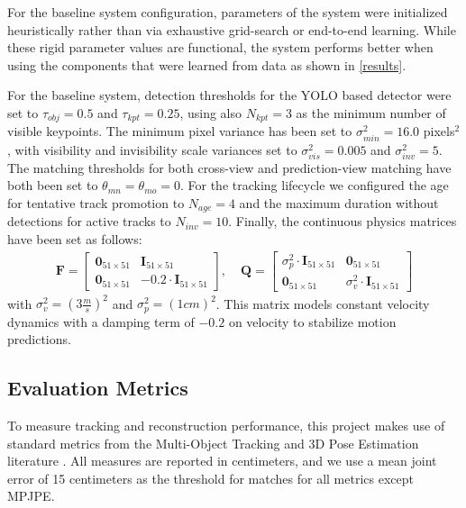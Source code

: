 For the baseline system configuration, parameters of the system were initialized heuristically rather than via exhaustive grid-search or end-to-end learning. While these rigid parameter values are functional, the system performs better when using the components that were learned from data as shown in \cref{results}.

For the baseline system, detection thresholds for the YOLO based detector were set to $\tau_{obj} = 0.5$ and $\tau_{kpt} = 0.25$, using also $N_{kpt} = 3$ as the minimum number of visible keypoints. The minimum pixel variance has been set to $\sigma_{min}^2 = 16.0$ pixels$^2$, with visibility and invisibility scale variances set to $\sigma_{vis}^2 = 0.005$ and $\sigma_{inv}^2 = 5$. The matching thresholds for both cross-view and prediction-view matching have both been set to $\theta_{mn} = \theta_{mo} = 0$. For the tracking lifecycle we configured the age for tentative track promotion to $N_{age} = 4$ and the maximum duration without detections for active tracks to $N_{inv} = 10$. Finally, the continuous physics matrices have been set as follows:
\begin{align*}
    \mathbf{F} = \begin{bmatrix} \mathbf{0}_{51 \times 51} & \mathbf{I}_{51 \times 51} \\ \mathbf{0}_{51 \times 51} & -0.2 \cdot \mathbf{I}_{51 \times 51} \end{bmatrix}, & \;
    \mathbf{Q} = \begin{bmatrix} \sigma_{p}^2 \cdot \mathbf{I}_{51 \times 51} & \mathbf{0}_{51 \times 51} \\ \mathbf{0}_{51 \times 51} & \sigma_{v}^2 \cdot \mathbf{I}_{51 \times 51} \end{bmatrix}
\end{align*}
with $\sigma_{v}^2 = (3 \frac{m}{s})^2$ and $\sigma_{p}^2 = (1 cm)^2$. This matrix models constant velocity dynamics with a damping term of $-0.2$ on velocity to stabilize motion predictions.


\subsection{Evaluation Metrics} \label{eval-metrics}

To measure tracking and reconstruction performance, this project makes use of standard metrics from the Multi-Object Tracking and 3D Pose Estimation literature \parencite{bernardin2008evaluating,ionescu2013human3}. All measures are reported in centimeters, and we use a mean joint error of 15 centimeters as the threshold for matches for all metrics except MPJPE.


